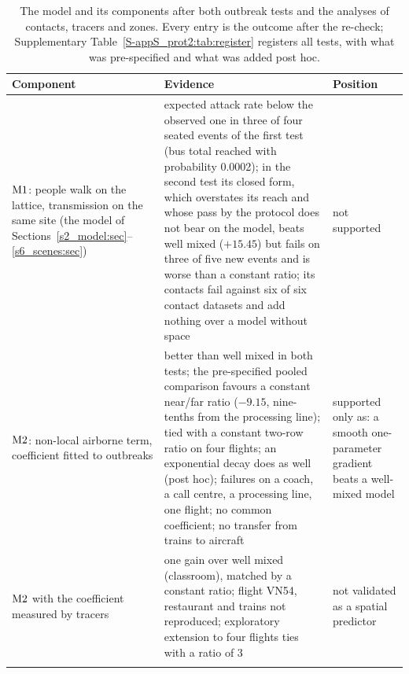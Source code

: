 \begin{table}[tbp]
  \centering\small
  \caption{The model and its components after both outbreak tests and the analyses of contacts, tracers and
  zones. Every entry is the outcome after the re-check; Supplementary Table~\ref{S-appS_prot2:tab:register}
  registers all tests, with what was pre-specified and what was added post hoc.}
  \label{s8b_evidence:tab:variants}
  \begin{tabular}{@{}>{\raggedright\arraybackslash}p{}>{\raggedright\arraybackslash}p{}>{\raggedright\arraybackslash}p{}@{}}
    \toprule
    Component & Evidence & Position \\
    \midrule
    $\mathrm{M1}$: people walk on the lattice, transmission on the same site (the model of
      Sections~\ref{s2_model:sec}--\ref{s6_scenes:sec}) &
      expected attack rate below the observed one in three of four seated events of the first test (bus total
      reached with probability 0.0002); in the second test its closed form, which overstates its reach and whose
      pass by the protocol does not bear on the model, beats well mixed ($+15.45$) but fails on three of five new
      events and is worse than a constant ratio; its contacts fail against six of six contact datasets and add
      nothing over a model without space &
      not supported \\\addlinespace[2pt]
    $\mathrm{M2}$: non-local airborne term, coefficient fitted to outbreaks &
      better than well mixed in both tests; the pre-specified pooled comparison favours a constant near/far
      ratio ($-9.15$, nine-tenths from the processing line); tied with a constant two-row ratio on four
      flights; an exponential decay does as well (post hoc); failures on a coach, a call centre, a processing
      line, one flight; no common coefficient; no transfer from trains to aircraft &
      supported only as: a smooth one-parameter gradient beats a well-mixed model \\\addlinespace[2pt]
    $\mathrm{M2}$ with the coefficient measured by tracers &
      one gain over well mixed (classroom), matched by a constant ratio; flight VN54, restaurant and trains
      not reproduced; exploratory extension to four flights ties with a ratio of 3 &
      not validated as a spatial predictor \\\addlinespace[2pt]

\end{tabular}
\end{table}
